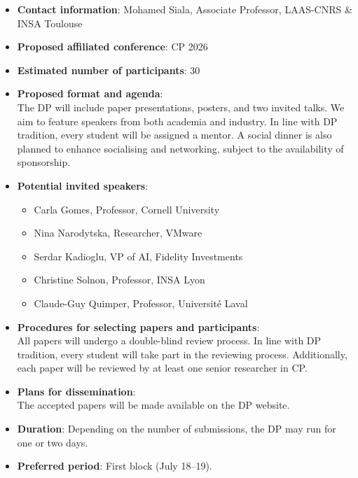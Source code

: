 \documentclass[12pt,a4paper]{article}
\begin{document}
\begin{itemize}
	\item \textbf{Contact information}: Mohamed Siala, Associate Professor, LAAS-CNRS \& INSA Toulouse
	\item \textbf{Proposed affiliated conference}: CP 2026
	\item \textbf{Estimated number of participants}: 30
	\item \textbf{Proposed format and agenda}: \\
	      The DP will include paper presentations,
	      posters, and two invited talks.
	      We aim to feature
	      speakers from both
	      academia and industry.
	      In line with DP tradition,
	      every student will be assigned a mentor.
	      A social dinner
	      is also planned to enhance socialising and networking,
	      subject to the availability of sponsorship.

	\item \textbf{Potential invited speakers}:
	      \begin{itemize}
		      \item Carla Gomes, Professor, Cornell University
		      \item Nina Narodytska, Researcher, VMware
		      \item Serdar Kadioglu,
		            VP of AI, Fidelity Investments
		      \item Christine Solnon, Professor, INSA Lyon
		      \item Claude-Guy Quimper, Professor, Université Laval
	      \end{itemize}

	\item \textbf{Procedures for selecting papers and participants}: \\
	      All papers will undergo a double-blind review process.
	      In line with DP
	      tradition, every student will take part in the reviewing process.
	      Additionally, each paper will be reviewed by at least one senior researcher in CP.

	\item \textbf{Plans for dissemination}: \\
	      The accepted papers will be made available on the DP website.

	\item \textbf{Duration}: Depending on the number of submissions,
	      the DP may run for one or two days.

	\item \textbf{Preferred period}: First block (July 18--19).
\end{itemize}
\end{document}
